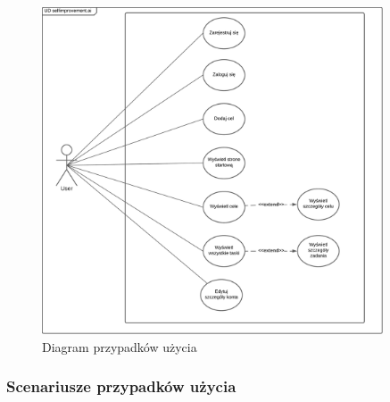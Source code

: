 \begin{figure}[H]
    \centering
    \includegraphics[width=0.9\textwidth]{Obrazy/diagrams/use_case_diagram.png}
    \caption{Diagram przypadków użycia}
    \label{fig:my_label}
\end{figure}

\subsubsection{Scenariusze przypadków użycia}

